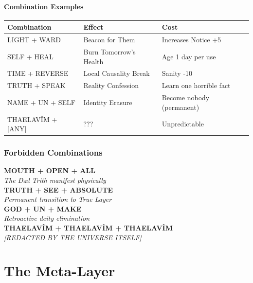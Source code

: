 \documentclass[11pt,a4paper,twoside]{book}
\begin{document}
\subsection{Combination Examples}

\begin{center}
\begin{tabular}{lll}
\textbf{Combination} & \textbf{Effect} & \textbf{Cost} \\
\hline
LIGHT + WARD & Beacon for Them & Increases Notice +5 \\
SELF + HEAL & Burn Tomorrow's Health & Age 1 day per use \\
TIME + REVERSE & Local Causality Break & Sanity -10 \\
TRUTH + SPEAK & Reality Confession & Learn one horrible fact \\
NAME + UN + SELF & Identity Erasure & Become nobody (permanent) \\
THAELAVÎM + [ANY] & ??? & Unpredictable \\
\end{tabular}
\end{center}

\section{Forbidden Combinations}

\begin{tcolorbox}[horrorbox={Never Speak These}]
\centering
\textbf{MOUTH + OPEN + ALL}\\
\textit{The Dæl Trith manifest physically}\\
\vspace{0.5em}
\textbf{TRUTH + SEE + ABSOLUTE}\\
\textit{Permanent transition to True Layer}\\
\vspace{0.5em}
\textbf{GOD + UN + MAKE}\\
\textit{Retroactive deity elimination}\\
\vspace{0.5em}
\textbf{THAELAVÎM + THAELAVÎM + THAELAVÎM}\\
\textit{[REDACTED BY THE UNIVERSE ITSELF]}\\
\end{tcolorbox}

\part{The Meta-Layer}
\end{document}
